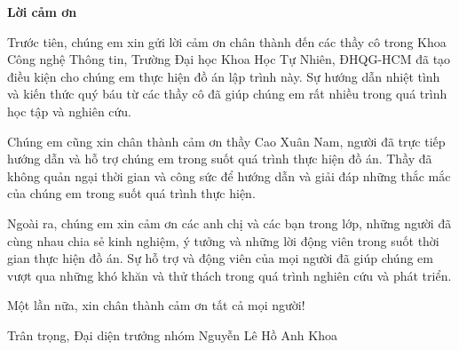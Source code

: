 \newpage
\vfill
\begin{center}
	\textbf{\Large Lời cảm ơn}
\end{center}
\indent\hspace{0.6cm} Trước tiên, chúng em xin gửi lời cảm ơn chân thành đến các thầy cô trong Khoa Công nghệ Thông tin, Trường Đại học Khoa Học Tự Nhiên, ĐHQG-HCM đã tạo điều kiện cho chúng em thực hiện đồ án lập trình này. Sự hướng dẫn nhiệt tình và kiến thức quý báu từ các thầy cô đã giúp chúng em rất nhiều trong quá trình học tập và nghiên cứu.\newline

Chúng em cũng xin chân thành cảm ơn thầy Cao Xuân Nam, người đã trực tiếp hướng dẫn và hỗ trợ chúng em trong suốt quá trình thực hiện đồ án. Thầy đã không quản ngại thời gian và công sức để hướng dẫn và giải đáp những thắc mắc của chúng em trong suốt quá trình thực hiện.\newline

Ngoài ra, chúng em xin cảm ơn các anh chị và các bạn trong lớp, những người đã cùng nhau chia sẻ kinh nghiệm, ý tưởng và những lời động viên trong suốt thời gian thực hiện đồ án. Sự hỗ trợ và động viên của mọi người đã giúp chúng em vượt qua những khó khăn và thử thách trong quá trình nghiên cứu và phát triển.\newline

Một lần nữa, xin chân thành cảm ơn tất cả mọi người!\newline

\indent Trân trọng,\newline
\indent Đại diện trưởng nhóm\newline
\indent Nguyễn Lê Hồ Anh Khoa
\vfill

\newpage